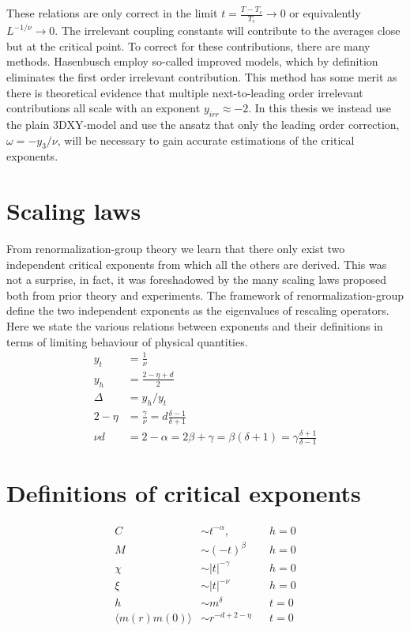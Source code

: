 These relations are only correct in the limit $t= \frac{T-T_c}{T_c} \rightarrow 0$ or equivalently $L^{-1/\nu} \rightarrow 0$.
The irrelevant coupling constants will contribute to the averages close but at the critical point.
To correct for these contributions, there are many methods. Hasenbusch employ so-called improved models, which by definition eliminates the first order irrelevant contribution.
This method has some merit as there is theoretical evidence that multiple next-to-leading order irrelevant contributions all scale with an exponent $y_{irr} \approx -2$.
In this thesis we instead use the plain 3DXY-model and use the ansatz that only the leading order correction, $\omega = -y_3/\nu$, will be necessary to gain accurate estimations of the critical exponents.
\section{Scaling laws}
From renormalization-group theory we learn that there only exist two independent critical exponents from which all the others are derived.
This was not a surprise, in fact, it was foreshadowed by the many scaling laws proposed both from prior theory and experiments.
The framework of renormalization-group define the two independent exponents as the eigenvalues of rescaling operators.
Here we state the various relations between exponents and their definitions in terms of limiting behaviour of physical quantities.
\begin{align}
  y_t &= \frac{1}{\nu}\\
  y_h &= \frac{2-\eta +d}{2}\\
  \Delta &= y_h/y_t\\
	2 - \eta &= \frac{\gamma}{\nu} = d\frac{\delta -1}{\delta+1}\\
	\nu d &= 2-\alpha = 2\beta + \gamma = \beta(\delta+1) = \gamma\frac{\delta +1}{\delta -1}
\end{align}
\section{Definitions of critical exponents}
\begin{align}
  C &\sim t^{-\alpha}, & &h=0\\
  M &\sim (-t)^{\beta} & &h=0\\
  \chi &\sim |t|^{-\gamma} & &h=0\\
  \xi &\sim |t|^{-\nu} & &h=0\\
  h &\sim m^{\delta} & &t=0\\
  \langle m(r)m(0)\rangle &\sim r^{-d +2 -\eta} & &t=0
  \label{}
\end{align}
